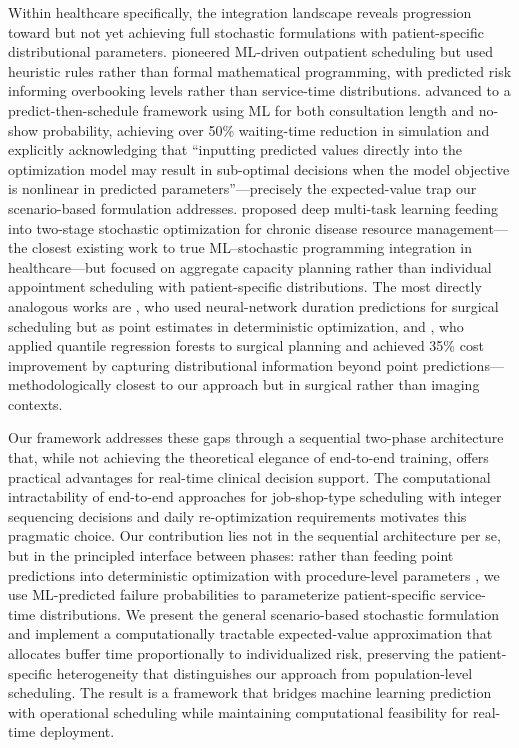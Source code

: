 \documentclass[11pt,a4paper]{article}
\begin{document}
Within healthcare specifically, the integration landscape reveals progression toward but not yet achieving full stochastic formulations with patient-specific distributional parameters. \citet{srinivas2018prescriptive} pioneered ML-driven outpatient scheduling but used heuristic rules rather than formal mathematical programming, with predicted risk informing overbooking levels rather than service-time distributions. \citet{salah2022predict} advanced to a predict-then-schedule framework using ML for both consultation length and no-show probability, achieving over 50\% waiting-time reduction in simulation and explicitly acknowledging that ``inputting predicted values directly into the optimization model may result in sub-optimal decisions when the model objective is nonlinear in predicted parameters''---precisely the expected-value trap our scenario-based formulation addresses. \citet{olya2022integrated} proposed deep multi-task learning feeding into two-stage stochastic optimization for chronic disease resource management---the closest existing work to true ML--stochastic programming integration in healthcare---but focused on aggregate capacity planning rather than individual appointment scheduling with patient-specific distributions. The most directly analogous works are \citet{gower2025predict}, who used neural-network duration predictions for surgical scheduling but as point estimates in deterministic optimization, and \citet{rottmann2025case}, who applied quantile regression forests to surgical planning and achieved 35\% cost improvement by capturing distributional information beyond point predictions---methodologically closest to our approach but in surgical rather than imaging contexts.

Our framework addresses these gaps through a sequential two-phase architecture that, while not achieving the theoretical elegance of end-to-end training, offers practical advantages for real-time clinical decision support. The computational intractability of end-to-end approaches for job-shop-type scheduling with integer sequencing decisions and daily re-optimization requirements motivates this pragmatic choice. Our contribution lies not in the sequential architecture per se, but in the principled interface between phases: rather than feeding point predictions into deterministic optimization with procedure-level parameters \citep{salah2022predict}, we use ML-predicted failure probabilities to parameterize patient-specific service-time distributions. We present the general scenario-based stochastic formulation and implement a computationally tractable expected-value approximation that allocates buffer time proportionally to individualized risk, preserving the patient-specific heterogeneity that distinguishes our approach from population-level scheduling. The result is a framework that bridges machine learning prediction with operational scheduling while maintaining computational feasibility for real-time deployment.
\end{document}

